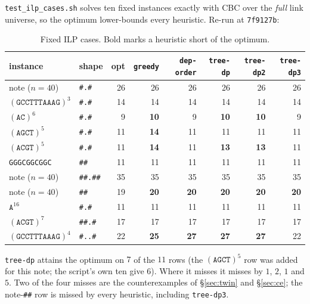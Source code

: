 \documentclass[11pt,a4paper]{article}
\theoremstyle{definition}
\theoremstyle{plain}
\theoremstyle{remark}
\begin{document}
\texttt{test\_ilp\_cases.sh} solves ten fixed instances exactly with CBC
over the \emph{full} link universe, so the optimum lower-bounds every
heuristic. Re-run at \texttt{7f9127b}:

\begin{table}[h]
\centering
\caption{Fixed ILP cases. Bold marks a heuristic short of the optimum.}
\label{tab:ilp}
\begin{tabular}{llrrrrrr}
\toprule
instance & shape & opt & \texttt{greedy} & \texttt{dep-order} &
\texttt{tree-dp} & \texttt{tree-dp2} & \texttt{tree-dp3} \\
\midrule
note ($n{=}40$)         & \texttt{\#.\#}    & 26 & 26 & 26 & 26 & 26 & 26 \\
$(\mathtt{GCCTTTAAAG})^3$ & \texttt{\#.\#}  & 14 & 14 & 14 & 14 & 14 & 14 \\
$(\mathtt{AC})^6$       & \texttt{\#.\#}    &  9 & \textbf{10} & 9 & \textbf{10} & \textbf{10} & 9 \\
$(\mathtt{AGCT})^5$     & \texttt{\#.\#}    & 11 & \textbf{14} & 11 & 11 & 11 & 11 \\
$(\mathtt{ACGT})^5$     & \texttt{\#.\#}    & 11 & \textbf{14} & 11 & \textbf{13} & \textbf{13} & 11 \\
\texttt{GGGCGGCGGC}     & \texttt{\#\#}     & 11 & 11 & 11 & 11 & 11 & 11 \\
note ($n{=}40$)         & \texttt{\#\#.\#\#}& 35 & 35 & 35 & 35 & 35 & 35 \\
note ($n{=}40$)         & \texttt{\#\#}     & 19 & \textbf{20} & \textbf{20} & \textbf{20} & \textbf{20} & \textbf{20} \\
$\mathtt{A}^{16}$       & \texttt{\#.\#}    & 11 & 11 & 11 & 11 & 11 & 11 \\
$(\mathtt{ACGT})^7$     & \texttt{\#\#.\#}  & 17 & 17 & 17 & 17 & 17 & 17 \\
$(\mathtt{GCCTTTAAAG})^4$& \texttt{\#..\#}  & 22 & \textbf{25} & \textbf{27} & \textbf{27} & \textbf{27} & 22 \\
\bottomrule
\end{tabular}
\end{table}

\texttt{tree-dp} attains the optimum on $7$ of the $11$ rows (the
$(\mathtt{AGCT})^5$ row was added for this note; the script's own ten
give $6$). Where it misses it misses by $1$, $2$, $1$ and $5$. Two of
the four misses are the counterexamples of \S\ref{sec:twin} and
\S\ref{sec:ce}; the note-\texttt{\#\#} row is missed by every heuristic,
including \texttt{tree-dp3}.
\end{document}
